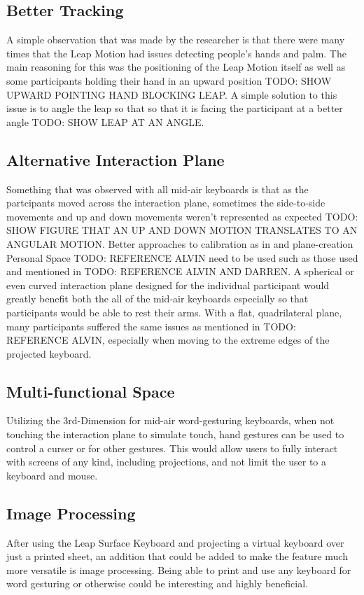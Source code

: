\subsection{Better Tracking}
A simple observation that was made by the researcher is that there were many times that the Leap Motion had issues detecting people's hands and palm. The main reasoning for this was the positioning of the Leap Motion itself as well as some participants holding their hand in an upward position TODO: SHOW UPWARD POINTING HAND BLOCKING LEAP. A simple solution to this issue is to angle the leap so that so that it is facing the participant at a better angle TODO: SHOW LEAP AT AN ANGLE.

\subsection{Alternative Interaction Plane}
Something that was observed with all mid-air keyboards is that as the partcipants moved across the interaction plane, sometimes the side-to-side movements and up and down movements weren't represented as expected TODO: SHOW FIGURE THAT AN UP AND DOWN MOTION TRANSLATES TO AN ANGULAR MOTION. Better approaches to calibration as in and plane-creation Personal Space TODO: REFERENCE ALVIN need to be used such as those used and mentioned in TODO: REFERENCE ALVIN AND DARREN. A spherical or even curved interaction plane designed for the individual participant would greatly benefit both the all of the mid-air keyboards especially so that participants would be able to rest their arms. With a flat, quadrilateral plane, many participants suffered the same issues as mentioned in TODO: REFERENCE ALVIN, especially when moving to the extreme edges of the projected keyboard.

\subsection{Multi-functional Space}
Utilizing the 3rd-Dimension for mid-air word-gesturing keyboards, when not touching the interaction plane to simulate touch, hand gestures can be used to control a curser or for other gestures. This would allow users to fully interact with screens of any kind, including projections, and not limit the user to a keyboard and mouse.

\subsection{Image Processing}
After using the Leap Surface Keyboard and projecting a virtual keyboard over just a printed sheet, an addition that could be added to make the feature much more versatile is image processing. Being able to print and use any keyboard for word gesturing or otherwise could be interesting and highly beneficial.

